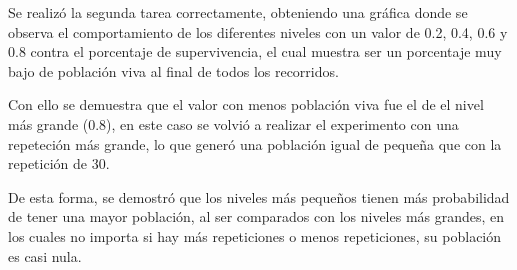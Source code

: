 \documentclass{article}
\begin{document}
 Se realiz\'{o} la segunda tarea correctamente, obteniendo una gráfica donde se observa el comportamiento de los diferentes niveles con un valor de 0.2, 0.4, 0.6 y 0.8 contra el porcentaje de supervivencia, el cual muestra ser un porcentaje muy bajo de población viva al final de todos los recorridos.
 
 Con ello se demuestra que el valor con menos población viva fue el de el nivel más grande (0.8), en este caso se volvió a realizar el experimento con una repeteción más grande, lo que generó una población igual de pequeña que con la repetición de 30.
 
 De esta forma, se demostró que los niveles más pequeños tienen más probabilidad de tener una mayor población, al ser comparados con los niveles más grandes, en los cuales no importa si hay más repeticiones o menos repeticiones, su población es casi nula.\citep{ejemplo2}
 
 

 
 

 
\end{document}
